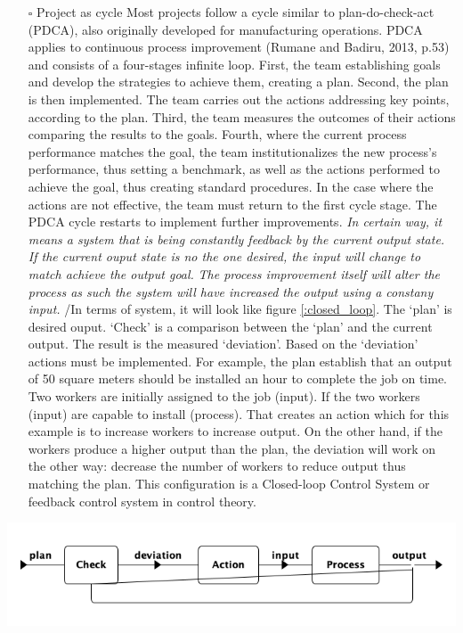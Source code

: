\documentclass{article}
\begin{document}
\begin{itemize}
\item[{$\square$}] Project as cycle
Most projects follow a cycle similar to plan-do-check-act (PDCA), also originally developed for manufacturing operations.
PDCA applies to continuous process improvement (Rumane and Badiru, 2013, p.53) and consists of a four-stages infinite loop.
First, the team establishing goals and develop the strategies to achieve them, creating a plan.
Second, the plan is then implemented.
The team carries out the actions addressing key points, according to the plan.
Third, the team measures the outcomes of their actions comparing the results to the goals.
Fourth, where the current process performance matches the goal, the team institutionalizes the new process’s performance, thus setting a benchmark, as well as the actions performed to achieve the goal, thus creating standard procedures.
In the case where the actions are not effective, the team must return to the first cycle stage.
The PDCA cycle restarts to implement further improvements.
\emph{In certain way, it means a system that is being constantly feedback by the current output state.}
\emph{If the current ouput state is no the one desired, the input will change to match achieve the output goal.}
\emph{The process improvement itself will alter the process as such the system will have increased the output using a constany input.}
/In terms of system, it will look like figure \ref{:closed_loop}.
The `plan' is desired ouput.
`Check' is a comparison between the `plan' and the current output.
The result is the measured `deviation'.
Based on the `deviation' actions must be implemented.
For example, the plan establish that an output of 50 square meters should be installed an hour to complete the job on time.
Two workers are initially assigned to the job (input).
If the two workers (input) are capable to install (process). 
That creates an action which for this example is to increase workers to increase output.
On the other hand, if the workers produce a higher output than the plan, the deviation will work on the other way: decrease the number of workers to reduce output thus matching the plan.
This configuration is a Closed-loop Control System or feedback control system in control theory.
\end{itemize}


\begin{center}
\includegraphics[width=.9\linewidth]{Figures/system_feedback_loop.png}
\end{center}
\end{document}

